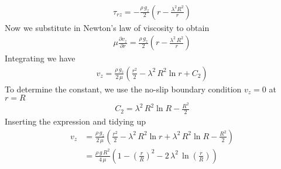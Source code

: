 \documentclass[calculator,datasheet,handbook]{exam}
\begin{document}
\begin{question}
\begin{enumerate}[a)]
{\begin{align*}
    \end{align*}
    \begin{align*}
      \tau_{rz} =-\frac{\rho\,g_z}{2}\left(r-\frac{\lambda^2 R^2}{r}\right)
    \end{align*}
    Now we substitute in Newton's law of viscosity to obtain
    \begin{align*}
      \mu\frac{\partial v_z}{\partial r}= \frac{\rho\,g_z}{2}\left(r-\frac{\lambda^2\,R^2}{r}\right)
    \end{align*}
    Integrating we have
    \begin{align*}
      v_z=
      \frac{\rho\,g_z}{2\,\mu}\left(\frac{r^2}{2} -\lambda^2\,R^2 \ln r + C_2\right)
    \end{align*}
    To determine the constant, we use the no-slip boundary condition
    $v_z=0$ at $r=R$ 
    \begin{align*}
      C_2 = \lambda^2\,R^2 \ln R -\frac{R^2}{2}
    \end{align*}
    Inserting the expression and tidying up
    \begin{align*}
      v_z&= \frac{\rho\,g_z}{2\,\mu}\left(\frac{r^2}{2}
        -\lambda^2\,R^2 \ln r +\lambda^2\,R^2 \ln R - \frac{R^2}{2} \right)\\
      &=\frac{\rho\,g\,R^2}{4\,\mu}\left(1-\left(\frac{r}{R}\right)^2
        -2\,\lambda^2\,\ln\left(\frac{r}{R}\right)\right)
    \end{align*}
  }
  \end{enumerate}
\end{question}
\end{document}
